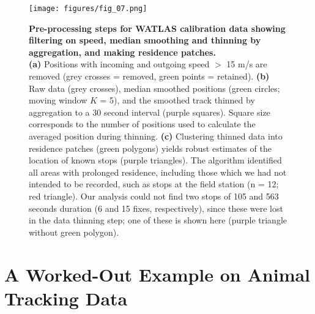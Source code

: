 \begin{refsection}[sorting=nyt]
    \begin{figure}[h!]
        \centering
        \texttt{[image: figures/fig\_07.png]}
        \caption{
            \textbf{Pre-processing steps for WATLAS calibration data showing filtering on speed, median smoothing and thinning by aggregation, and making residence patches.}\\
            \textbf{(a)} Positions with incoming and outgoing speed $>$ 15 m/s are removed (grey crosses = removed, green points = retained).
            \textbf{(b)} Raw data (grey crosses), median smoothed positions (green circles; moving window $K$ = 5), and the smoothed track thinned by aggregation to a 30 second interval (purple squares).
            Square size corresponds to the number of positions used to calculate the averaged position during thinning.
            \textbf{(c)} Clustering thinned data into residence patches (green polygons) yields robust estimates of the location of known stops (purple triangles).
            The algorithm identified all areas with prolonged residence, including those which we had not intended to be recorded, such as stops at the field station (n = 12; red triangle).
            Our analysis could not find two stops of 105 and 563 seconds duration (6 and 15 fixes, respectively), since these were lost in the data thinning step; one of these is shown here (purple triangle without green polygon).
        }
        \label{fig:figure_calibration}
    \end{figure}

    \section*{A Worked-Out Example on Animal Tracking Data}


\end{refsection}

